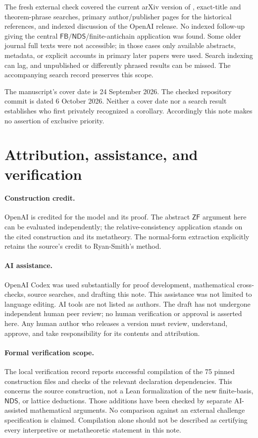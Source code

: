 \documentclass[11pt,a4paper]{article}
\newcommand{\ZF}{\mathsf{ZF}}
\newcommand{\NDS}{\mathsf{NDS}}
\newcommand{\FB}{\mathsf{FB}}
\theoremstyle{definition}
\theoremstyle{remark}
\begin{document}
The fresh external check covered the current arXiv version of \cite{BK}, exact-title and theorem-phrase searches, primary author/publisher pages for the historical references, and indexed discussion of the OpenAI release. No indexed follow-up giving the central $\FB/\NDS$/finite-antichain application was found. Some older journal full texts were not accessible; in those cases only available abstracts, metadata, or explicit accounts in primary later papers were used. Search indexing can lag, and unpublished or differently phrased results can be missed. The accompanying search record preserves this scope.

The manuscript's cover date is 24 September 2026. The checked repository commit is dated 6 October 2026. Neither a cover date nor a search result establishes who first privately recognized a corollary. Accordingly this note makes no assertion of exclusive priority.

\section{Attribution, assistance, and verification}\label{provenance}

\paragraph{Construction credit.}
OpenAI is credited for the model and its proof. The abstract $\ZF$ argument here can be evaluated independently; the relative-consistency application stands on the cited construction and its metatheory. The normal-form extraction explicitly retains the source's credit to Ryan-Smith's method.

\paragraph{AI assistance.}
OpenAI Codex was used substantially for proof development, mathematical cross-checks, source searches, and drafting this note. This assistance was not limited to language editing. AI tools are not listed as authors. The draft has not undergone independent human peer review; no human verification or approval is asserted here. Any human author who releases a version must review, understand, approve, and take responsibility for its contents and attribution.

\paragraph{Formal verification scope.}
The local verification record reports successful compilation of the 75 pinned construction files and checks of the relevant declaration dependencies. This concerns the source construction, not a Lean formalization of the new finite-basis, $\NDS$, or lattice deductions. Those additions have been checked by separate AI-assisted mathematical arguments. No comparison against an external challenge specification is claimed. Compilation alone should not be described as certifying every interpretive or metatheoretic statement in this note.
\end{document}
